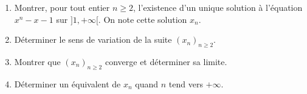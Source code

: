 \documentclass[a4paper,10pt]{report}
\begin{document}
%
%
%

%
%

%    
%

\begin{Exa}
\begin{enumerate}
\item Montrer, pour tout entier $n \geq 2$,  l'existence d'un unique solution à l'équation $x^n-x-1$ sur $]1, + \infty[$. On note cette solution $x_n$.
\item Déterminer le sens de variation de la suite $(x_n)_{n \geq 2}$.
\item Montrer que  $(x_n)_{n \geq 2}$ converge et déterminer sa limite.
\item Déterminer un équivalent de $x_n$ quand $n$ tend vers $+ \infty$.
\end{enumerate}
\end{Exa}
\end{document}
